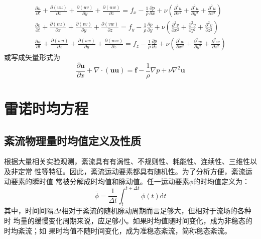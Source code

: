 \begin{subequations}
  \begin{align}
    \frac{\partial u}{\partial t}
    +
    \frac{\partial (uu)}{\partial x}
    +
    \frac{\partial (uv)}{\partial y}
    +
    \frac{\partial (uw)}{\partial z}
    =
    f_{x}
    -\frac{1}{\rho}\frac{\partial p}{\partial x}
    +
    \nu
    \left(
    \frac{\partial^{2} u}{\partial x^{2}} +
    \frac{\partial^{2} u}{\partial y^{2}} +
    \frac{\partial^{2} u}{\partial z^{2}}
    \right)
    \label{EqCGe_NS_Me_x}
    \\
    \frac{\partial v}{\partial t}
    +
    \frac{\partial (vu)}{\partial x}
    +
    \frac{\partial (vv)}{\partial y}
    +
    \frac{\partial (vw)}{\partial z}
    =
    f_{y}
    -\frac{1}{\rho}\frac{\partial p}{\partial y}
    +
    \nu
    \left(
    \frac{\partial^{2} v}{\partial x^{2}} +
    \frac{\partial^{2} v}{\partial y^{2}} +
    \frac{\partial^{2} v}{\partial z^{2}}
    \right)
    \\
    \frac{\partial w}{\partial t}
    +
    \frac{\partial (wu)}{\partial x}
    +
    \frac{\partial (wv)}{\partial y}
    +
    \frac{\partial (ww)}{\partial z}
    =
    f_{z}
    -\frac{1}{\rho}\frac{\partial p}{\partial z}
    +
    \nu
    \left(
    \frac{\partial^{2} w}{\partial x^{2}} +
    \frac{\partial^{2} w}{\partial y^{2}} +
    \frac{\partial^{2} w}{\partial z^{2}}
    \right)
  \end{align}
  \label{EqCGe_NS_Me}
\end{subequations}
或写成矢量形式为
\begin{equation}
  \frac{\partial \mathbf{u}}{\partial x} +
  \nabla\cdot(\mathbf{u}\mathbf{u})
  =
  \mathbf{f} -
  \frac{1}{\rho}\nabla p +
  \nu\nabla^{2}\mathbf{u}
\end{equation}


\section{雷诺时均方程}
\subsection{紊流物理量时均值定义及性质}
根据大量相关实验观测，紊流具有有涡性、不规则性、耗能性、连续性、三维性以及非定常
性等特征。因此，紊流运动要素都具有随机性。为了分析方便，紊流运动要素的瞬时值
常被分解成时均值和脉动值。任一运动要素$\phi$的时均值定义为：
\begin{equation}
  \overline{\phi}
  =
  \frac{1}{\Delta t}
  \int_{t}^{t+\Delta t}\!
  \phi(t)
  \mathrm{d}t
  \label{EqCGe_RA}
\end{equation}
其中，时间间隔$\Delta t$相对于紊流的随机脉动周期而言足够大，但相对于流场的各种时
均量的缓慢变化周期来说，应足够小。如果时均值随时间变化，成为非稳态的时均紊流；如
果时均值不随时间变化，成为准稳态紊流，简称稳态紊流。

